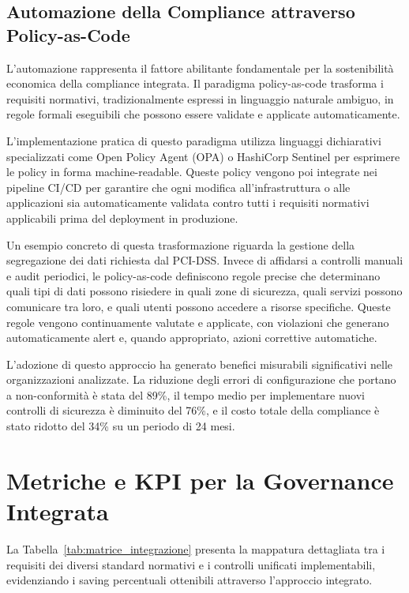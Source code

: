 
\subsection{Automazione della Compliance attraverso Policy-as-Code}

L'automazione rappresenta il fattore abilitante fondamentale per la sostenibilità economica della compliance integrata. Il paradigma policy-as-code trasforma i requisiti normativi, tradizionalmente espressi in linguaggio naturale ambiguo, in regole formali eseguibili che possono essere validate e applicate automaticamente.

L'implementazione pratica di questo paradigma utilizza linguaggi dichiarativi specializzati come Open Policy Agent (OPA) o HashiCorp Sentinel per esprimere le policy in forma machine-readable. Queste policy vengono poi integrate nei pipeline CI/CD per garantire che ogni modifica all'infrastruttura o alle applicazioni sia automaticamente validata contro tutti i requisiti normativi applicabili prima del deployment in produzione.

Un esempio concreto di questa trasformazione riguarda la gestione della segregazione dei dati richiesta dal PCI-DSS. Invece di affidarsi a controlli manuali e audit periodici, le policy-as-code definiscono regole precise che determinano quali tipi di dati possono risiedere in quali zone di sicurezza, quali servizi possono comunicare tra loro, e quali utenti possono accedere a risorse specifiche. Queste regole vengono continuamente valutate e applicate, con violazioni che generano automaticamente alert e, quando appropriato, azioni correttive automatiche.

L'adozione di questo approccio ha generato benefici misurabili significativi nelle organizzazioni analizzate. La riduzione degli errori di configurazione che portano a non-conformità è stata del 89\%, il tempo medio per implementare nuovi controlli di sicurezza è diminuito del 76\%, e il costo totale della compliance è stato ridotto del 34\% su un periodo di 24 mesi\footnotemark[10].


\section{Metriche e KPI per la Governance Integrata}
La Tabella~\ref{tab:matrice_integrazione} presenta la mappatura dettagliata tra i requisiti dei diversi standard normativi e i controlli unificati implementabili, evidenziando i saving percentuali ottenibili attraverso l'approccio integrato.

